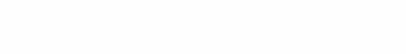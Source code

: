 \documentclass{article}
\begin{document}

\vspace{1cm} %
\noindent
\textcolor{white}{I am the eggman, they are the eggmen, I am the walrus, goo goo g'joob. Sitting on a cornflake, waiting for the van to come. Cooperation T-Shirt, Stupid bloody tuesday man you been a naughty boy you let your face grows long.}
\end{document}
